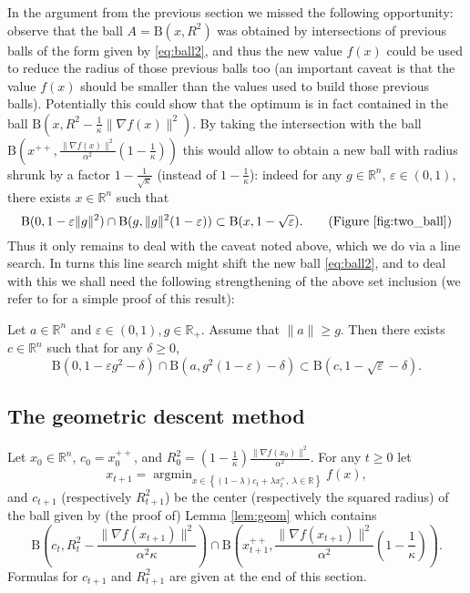 \documentclass[openany]{now}
\newcommand{\mB}{\mathrm{B}}
\newcommand{\R}{\mathbb{R}}
\renewcommand{\epsilon}{\varepsilon}
\newcommand{\argmin}{\mathop{\mathrm{argmin}}}
\begin{document}
In the argument from the previous section we missed the following opportunity: observe that the ball $A=\mB(x,R^2)$ was obtained by intersections of previous balls of the form given by \eqref{eq:ball2}, and thus the new value $f(x)$ could be used to reduce the radius of those previous balls too (an important caveat is that the value $f(x)$ should be smaller than the values used to build those previous balls). Potentially this could show that the optimum is in fact contained in the ball $\mB\left(x, R^2 - \frac{1}{\kappa} \|\nabla f(x)\|^2\right)$. By taking the intersection with the ball $\mB\left(x^{++}, \frac{\|\nabla f(x)\|^2}{\alpha^2} \left(1 - \frac{1}{\kappa}\right)\right)$ this would allow to obtain a new ball with radius shrunk by a factor $1- \frac{1}{\sqrt{\kappa}}$ (instead of $1 - \frac{1}{\kappa}$): indeed for any $g \in \R^n$, $\epsilon \in (0,1)$, there exists $x \in \R^n$ such that
$$\mB(0,1 - \epsilon \|g\|^2) \cap \mB(g, \|g\|^2 (1- \epsilon)) \subset \mB(x, 1-\sqrt{\epsilon}) . \quad \quad \text{(Figure \ref{fig:two_ball})}$$
Thus it only remains to deal with the caveat noted above, which we do via a line search. In turns this line search might shift the new ball \eqref{eq:ball2}, and to deal with this we shall need the following strengthening of the above set inclusion (we refer to \cite{BLS15} for a simple proof of this result):
\begin{lemma} \label{lem:geom}
Let $a \in \R^n$ and $\epsilon \in (0,1), g \in \R_+$. Assume that $\|a\| \geq g$. Then there exists $c \in \R^n$ such that for any $\delta \geq 0$,
$$\mB(0,1 - \epsilon g^2 - \delta) \cap \mB(a, g^2(1-\epsilon) - \delta) \subset \mB\left(c, 1 - \sqrt{\epsilon} - \delta \right) .$$
\end{lemma}

\subsection{The geometric descent method} \label{sec:GeoDmethod}
Let $x_0 \in \R^n$, $c_0 = x_0^{++}$, and $R_0^2 = \left(1 - \frac{1}{\kappa}\right)\frac{\|\nabla f(x_0)\|^2}{\alpha^2}$. For any $t \geq 0$ let
$$x_{t+1} = \argmin_{x \in \left\{(1-\lambda) c_t + \lambda x_t^+, \ \lambda \in \R \right\}} f(x) ,$$
and $c_{t+1}$ (respectively $R^2_{t+1}$) be the center (respectively the squared radius) of the ball given by (the proof of) Lemma \ref{lem:geom} which contains
$$\mB\left(c_t, R_t^2 - \frac{\|\nabla f(x_{t+1})\|^2}{\alpha^2 \kappa}\right) \cap \mB\left(x_{t+1}^{++}, \frac{\|\nabla f(x_{t+1})\|^2}{\alpha^2} \left(1 - \frac{1}{\kappa}\right) \right).$$
Formulas for $c_{t+1}$ and $R^2_{t+1}$ are given at the end of this section.
\end{document}
